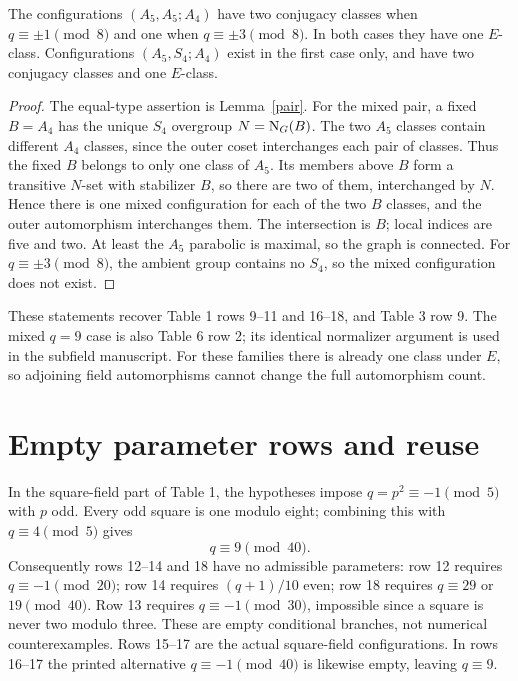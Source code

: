 \documentclass[11pt]{article}
\begin{document}
\begin{theorem}\label{a4}
The configurations $(A_5,A_5;A_4)$ have two conjugacy classes
when $q\equiv\pm1\pmod8$ and one when
$q\equiv\pm3\pmod8$. In both cases they have one $E$-class.
Configurations $(A_5,S_4;A_4)$ exist in the first case only, and
have two conjugacy classes and one $E$-class.
\end{theorem}
\begin{proof}
The equal-type assertion is Lemma~\ref{pair}. For the mixed pair,
a fixed $B=A_4$ has the unique $S_4$ overgroup $N=\operatorname{N}_G(B)$.
The two $A_5$ classes contain different $A_4$ classes, since the
outer coset interchanges each pair of classes. Thus the fixed $B$
belongs to only one class of $A_5$. Its members above $B$ form
a transitive $N$-set with stabilizer $B$, so there are two of them,
interchanged by $N$. Hence there is one mixed configuration for
each of the two $B$ classes, and the outer automorphism interchanges
them. The intersection is $B$; local indices are five and two.
At least the $A_5$ parabolic is maximal, so the graph is connected.
For $q\equiv\pm3\pmod8$, the ambient group contains no $S_4$,
so the mixed configuration does not exist.
\end{proof}

These statements recover Table 1 rows 9--11 and 16--18, and
Table 3 row 9. The mixed $q=9$ case is also Table 6 row 2;
its identical normalizer argument is used in the subfield manuscript.
For these families there is already one class under $E$, so adjoining
field automorphisms cannot change the full automorphism count.

\section{Empty parameter rows and reuse}
In the square-field part of Table 1, the hypotheses impose
$q=p^2\equiv-1\pmod5$ with $p$ odd. Every odd square is one
modulo eight; combining this with $q\equiv4\pmod5$ gives
\[
 q\equiv9\pmod {40}.
\]
Consequently rows 12--14 and 18 have no admissible parameters:
row 12 requires $q\equiv-1\pmod {20}$; row 14 requires
$(q+1)/10$ even; row 18 requires $q\equiv29$ or $19\pmod {40}$.
Row 13 requires $q\equiv-1\pmod {30}$, impossible since a
square is never two modulo three. These are empty conditional
branches, not numerical counterexamples. Rows 15--17 are the actual
square-field configurations. In rows 16--17 the printed alternative
$q\equiv-1\pmod {40}$ is likewise empty, leaving $q\equiv9$.
\end{document}
